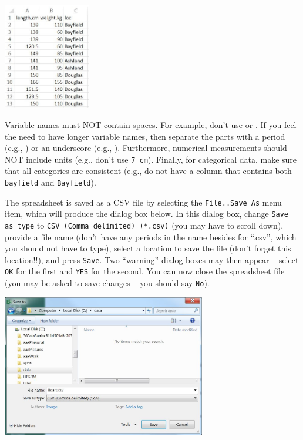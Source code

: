 \documentclass[10pt,openany]{book}\usepackage[]{graphicx}\usepackage[]{color}
\begin{document}
\begin{center}
  \includegraphics[width=1.5in]{Figs/Data_File_1.jpg}
\end{center}



\vspace{-12pt}

Variable names must NOT contain spaces.  For example, don't use  or .  If you feel the need to have longer variable names, then separate the parts with a period (e.g., ) or an underscore (e.g., ).  Furthermore, numerical measurements should NOT include units (e.g., don't use \verb"7 cm").  Finally, for categorical data, make sure that all categories are consistent (e.g., do not have a column that contains both \verb"bayfield" and \verb"Bayfield").


The spreadsheet is saved as a CSV file by selecting the \verb"File..Save As" menu item, which will produce the dialog box below. In this dialog box, change \verb"Save as type" to \verb"CSV (Comma delimited) (*.csv)" (you may have to scroll down), provide a file name (don't have any periods in the name besides for ``.csv'', which you should not have to type), select a location to save the file (don't forget this location!!), and press \verb"Save".  Two ``warning'' dialog boxes may then appear -- select \verb"OK" for the first and \verb"YES" for the second.  You can now close the spreadsheet file (you may be asked to save changes -- you should say \verb"No").
\begin{center}
  \includegraphics[width=3.5in]{Figs/Data_File_2.jpg}
\end{center}
\end{document}
